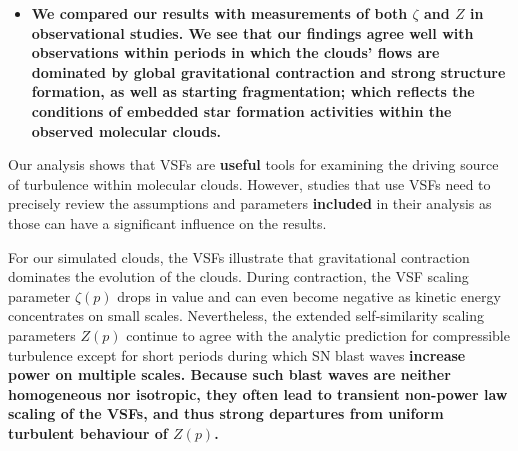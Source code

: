 \begin{itemize}
\item \textbf{We compared our results with measurements of both $\zeta$ and $Z$ in observational studies. We see that our findings agree well with observations within periods in which the clouds' flows are dominated by global gravitational contraction and strong structure formation, as well as starting fragmentation; which reflects the conditions of embedded star formation activities within the observed molecular clouds.}
\end{itemize}

Our analysis shows that VSFs are \textbf{useful} tools for examining the driving source of turbulence within molecular clouds.
However, studies that use VSFs need to precisely review the assumptions and parameters \textbf{included} in their analysis as those can have a significant influence on the results.

For our simulated clouds, the VSFs illustrate that gravitational contraction dominates the evolution of the clouds.
During contraction, the VSF scaling parameter $\zeta(p)$ drops in value and can even become negative as kinetic energy concentrates on small scales.
Nevertheless, the extended self-similarity scaling parameters $Z(p)$ continue to agree with the analytic prediction for compressible turbulence except for short periods during which SN blast waves \textbf{increase power on multiple scales.
Because such blast waves are neither homogeneous nor isotropic, they often lead to transient non-power law scaling of the VSFs, and thus strong departures from uniform turbulent behaviour of $Z(p)$.} 



\endinput
